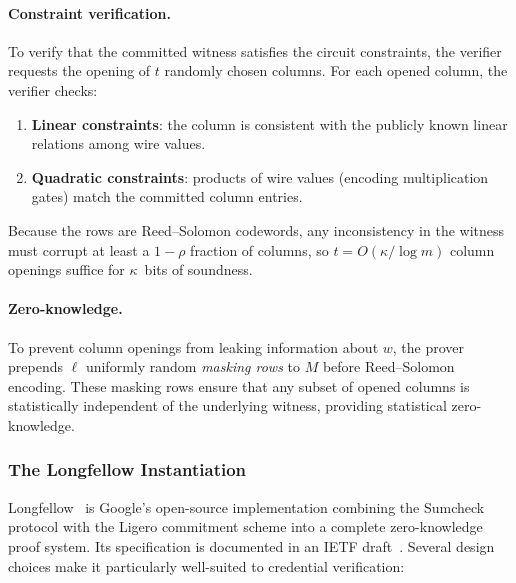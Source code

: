 \paragraph{Constraint verification.}
To verify that the committed witness satisfies the circuit constraints, the
verifier requests the opening of $t$ randomly chosen columns.  For each opened
column, the verifier checks:
\begin{enumerate}[label=(\roman*)]
  \item \textbf{Linear constraints}: the column is consistent with the
        publicly known linear relations among wire values.
  \item \textbf{Quadratic constraints}: products of wire values (encoding
        multiplication gates) match the committed column entries.
\end{enumerate}
Because the rows are Reed--Solomon codewords, any inconsistency in the witness
must corrupt at least a $1 - \rho$ fraction of columns, so $t = O(\kappa /
\log m)$ column openings suffice for $\kappa$~bits of soundness.

\paragraph{Zero-knowledge.}
To prevent column openings from leaking information about $w$, the prover
prepends $\ell$ uniformly random \emph{masking rows} to $M$ before Reed--Solomon
encoding.  These masking rows ensure that any subset of opened columns is
statistically independent of the underlying witness, providing statistical
zero-knowledge.

\subsubsection{The Longfellow Instantiation}\label{sec:bg-longfellow}

Longfellow~\cite{longfellow} is Google's open-source implementation combining
the Sumcheck protocol with the Ligero commitment scheme into a complete
zero-knowledge proof system.  Its specification is documented in an IETF
draft~\cite{longfellow-ietf}.  Several design choices make it particularly
well-suited to credential verification:

